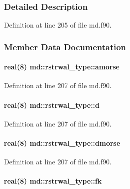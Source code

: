 \subsubsection{Detailed Description}


Definition at line 205 of file md.\-f90.



\subsubsection{Member Data Documentation}
\hypertarget{structmd_1_1rstrwal__type_a5963863d1de8cb07e064144abdd8610b}{
\paragraph[{amorse}]{\setlength{\rightskip}{0pt plus 5cm}real(8) md\-::rstrwal\-\_\-type\-::amorse}}\label{structmd_1_1rstrwal__type_a5963863d1de8cb07e064144abdd8610b}


Definition at line 207 of file md.\-f90.

\hypertarget{structmd_1_1rstrwal__type_a75dd6532257d884732247a1069982074}{
\paragraph[{d}]{\setlength{\rightskip}{0pt plus 5cm}real(8) md\-::rstrwal\-\_\-type\-::d}}\label{structmd_1_1rstrwal__type_a75dd6532257d884732247a1069982074}


Definition at line 207 of file md.\-f90.

\hypertarget{structmd_1_1rstrwal__type_a2df4ba5631c1dd5ce15fe3fba79a6bcb}{
\paragraph[{dmorse}]{\setlength{\rightskip}{0pt plus 5cm}real(8) md\-::rstrwal\-\_\-type\-::dmorse}}\label{structmd_1_1rstrwal__type_a2df4ba5631c1dd5ce15fe3fba79a6bcb}


Definition at line 207 of file md.\-f90.

\hypertarget{structmd_1_1rstrwal__type_a2c30c3cad49818d29a316d190d9a31c4}{
\paragraph[{fk}]{\setlength{\rightskip}{0pt plus 5cm}real(8) md\-::rstrwal\-\_\-type\-::fk}}\label{structmd_1_1rstrwal__type_a2c30c3cad49818d29a316d190d9a31c4}


